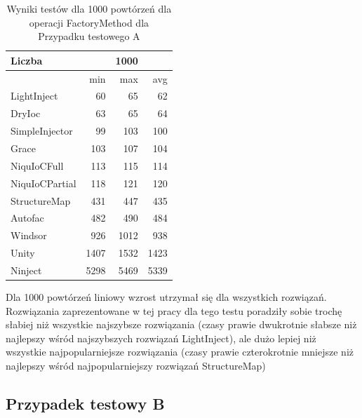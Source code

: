 \documentclass[12pt]{article}
\begin{document}
\begin{table}[H]
\captionsetup{belowskip=0pt,aboveskip=0pt}
\begin{center}
\begin{small}
	\begin{tabular}{ | l | r r r | }
    		\hline
Liczba & & 1000 & \\ \hline
 & min & max & avg \\ \hline
LightInject & 60 & 65 & 62 \\ \hline
DryIoc & 63 & 65 & 64 \\ \hline
SimpleInjector & 99 & 103 & 100 \\ \hline
Grace & 103 & 107 & 104 \\ \hline
NiquIoCFull & 113 & 115 & 114 \\ \hline
NiquIoCPartial & 118 & 121 & 120 \\ \hline
StructureMap & 431 & 447 & 435 \\ \hline
Autofac & 482 & 490 & 484 \\ \hline
Windsor & 926 & 1012 & 938 \\ \hline
Unity & 1407 & 1532 & 1423 \\ \hline
Ninject & 5298 & 5469 & 5339 \\ \hline
  	\end{tabular}
\end{small}
\end{center}
\caption{Wyniki testów dla 1000 powtórzeń dla operacji FactoryMethod dla Przypadku testowego A}
\label{TestCaseA_FactoryMethod1000}
\end{table}
Dla 1000 powtórzeń liniowy wzrost utrzymał się dla wszystkich rozwiązań. Rozwiązania zaprezentowane w tej pracy dla tego testu poradziły sobie trochę słabiej niż wszystkie najszybsze rozwiązania (czasy prawie dwukrotnie słabsze niż najlepszy wśród najszybszych rozwiązań LightInject), ale dużo lepiej niż wszystkie najpopularniejsze rozwiązania (czasy prawie czterokrotnie mniejsze niż najlepszy wśród najpopularniejszy rozwiązań StructureMap)


\subsection{Przypadek testowy B}
\end{document}
